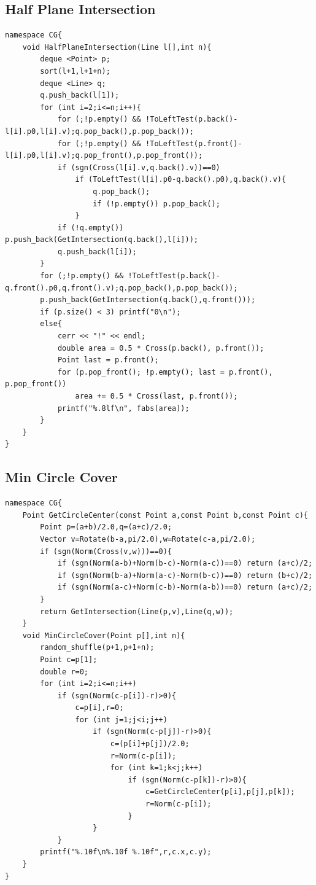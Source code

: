 \documentclass[10pt]{ctexart}
\begin{document}
{{\subsection{Half Plane Intersection}
\begin{lstlisting}
namespace CG{
    void HalfPlaneIntersection(Line l[],int n){
        deque <Point> p;
        sort(l+1,l+1+n);
        deque <Line> q;
        q.push_back(l[1]);
        for (int i=2;i<=n;i++){
            for (;!p.empty() && !ToLeftTest(p.back()-l[i].p0,l[i].v);q.pop_back(),p.pop_back());
            for (;!p.empty() && !ToLeftTest(p.front()-l[i].p0,l[i].v);q.pop_front(),p.pop_front());
            if (sgn(Cross(l[i].v,q.back().v))==0)
                if (ToLeftTest(l[i].p0-q.back().p0),q.back().v){
                    q.pop_back();
                    if (!p.empty()) p.pop_back();
                }
            if (!q.empty()) p.push_back(GetIntersection(q.back(),l[i]));
            q.push_back(l[i]);
        }
        for (;!p.empty() && !ToLeftTest(p.back()-q.front().p0,q.front().v);q.pop_back(),p.pop_back());
        p.push_back(GetIntersection(q.back(),q.front()));
        if (p.size() < 3) printf("0\n");
        else{
            cerr << "!" << endl;
            double area = 0.5 * Cross(p.back(), p.front());
            Point last = p.front();
            for (p.pop_front(); !p.empty(); last = p.front(), p.pop_front())
                area += 0.5 * Cross(last, p.front());
            printf("%.8lf\n", fabs(area));
        }
    }
}
\end{lstlisting}
\subsection{Min Circle Cover}
\begin{lstlisting}
namespace CG{
    Point GetCircleCenter(const Point a,const Point b,const Point c){
        Point p=(a+b)/2.0,q=(a+c)/2.0;
        Vector v=Rotate(b-a,pi/2.0),w=Rotate(c-a,pi/2.0);
        if (sgn(Norm(Cross(v,w)))==0){
            if (sgn(Norm(a-b)+Norm(b-c)-Norm(a-c))==0) return (a+c)/2;
            if (sgn(Norm(b-a)+Norm(a-c)-Norm(b-c))==0) return (b+c)/2;
            if (sgn(Norm(a-c)+Norm(c-b)-Norm(a-b))==0) return (a+c)/2;
        }
        return GetIntersection(Line(p,v),Line(q,w));
    }
    void MinCircleCover(Point p[],int n){
        random_shuffle(p+1,p+1+n);
        Point c=p[1];
        double r=0;
        for (int i=2;i<=n;i++)
            if (sgn(Norm(c-p[i])-r)>0){
                c=p[i],r=0;
                for (int j=1;j<i;j++)
                    if (sgn(Norm(c-p[j])-r)>0){
                        c=(p[i]+p[j])/2.0;
                        r=Norm(c-p[i]);
                        for (int k=1;k<j;k++)
                            if (sgn(Norm(c-p[k])-r)>0){
                                c=GetCircleCenter(p[i],p[j],p[k]);
                                r=Norm(c-p[i]);
                            }
                    }
            }
        printf("%.10f\n%.10f %.10f",r,c.x,c.y);
    }
}
\end{lstlisting}
}}
\end{document}
